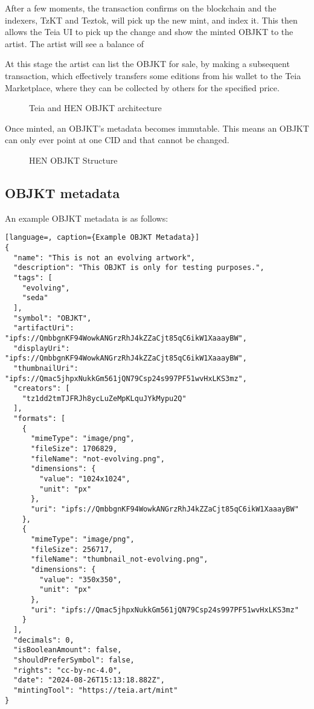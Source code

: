After a few moments, the transaction confirms on the blockchain and the indexers, TzKT and Teztok, will pick up the new mint, and index it. This then allows the Teia UI to pick up the change and show the minted OBJKT to the artist. The artist will see a balance of 

At this stage the artist can list the OBJKT for sale, by making a subsequent transaction, which effectively transfers some editions from his wallet to the Teia Marketplace, where they can be collected by others for the specified price.

\begin{figure}[h]
    \centering
    \captionsetup{justification=centering}
    
    \caption[Teia and HEN OBJKT architecture]{Teia and HEN OBJKT architecture}
    \label{fig:teia-arch}
\end{figure}

Once minted, an OBJKT's metadata becomes immutable. This means an OBJKT can only ever point at one CID and that cannot be changed.

\begin{figure}[h]
    \centering
    \captionsetup{justification=centering}
    
    \caption[HEN OBJKT Structure]{HEN OBJKT Structure}
    \label{fig:objkt-struct}
\end{figure}

\subsection{OBJKT metadata}

An example OBJKT metadata is as follows:

\vspace{0.5cm}

\begin{lstlisting}[language=, caption={Example OBJKT Metadata}]
{
  "name": "This is not an evolving artwork",
  "description": "This OBJKT is only for testing purposes.",
  "tags": [
    "evolving",
    "seda"
  ],
  "symbol": "OBJKT",
  "artifactUri": "ipfs://QmbbgnKF94WowkANGrzRhJ4kZZaCjt85qC6ikW1XaaayBW",
  "displayUri": "ipfs://QmbbgnKF94WowkANGrzRhJ4kZZaCjt85qC6ikW1XaaayBW",
  "thumbnailUri": "ipfs://Qmac5jhpxNukkGm561jQN79Csp24s997PF51wvHxLKS3mz",
  "creators": [
    "tz1dd2tmTJFRJh8ycLuZeMpKLquJYkMypu2Q"
  ],
  "formats": [
    {
      "mimeType": "image/png",
      "fileSize": 1706829,
      "fileName": "not-evolving.png",
      "dimensions": {
        "value": "1024x1024",
        "unit": "px"
      },
      "uri": "ipfs://QmbbgnKF94WowkANGrzRhJ4kZZaCjt85qC6ikW1XaaayBW"
    },
    {
      "mimeType": "image/png",
      "fileSize": 256717,
      "fileName": "thumbnail_not-evolving.png",
      "dimensions": {
        "value": "350x350",
        "unit": "px"
      },
      "uri": "ipfs://Qmac5jhpxNukkGm561jQN79Csp24s997PF51wvHxLKS3mz"
    }
  ],
  "decimals": 0,
  "isBooleanAmount": false,
  "shouldPreferSymbol": false,
  "rights": "cc-by-nc-4.0",
  "date": "2024-08-26T15:13:18.882Z",
  "mintingTool": "https://teia.art/mint"
}
\end{lstlisting}

